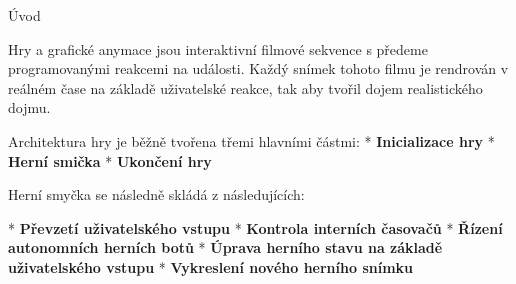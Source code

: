 \chap Úvod

Hry a grafické anymace jsou interaktivní filmové sekvence s předeme programovanými reakcemi na události. Každý snímek tohoto filmu je rendrován v reálném čase na základě uživatelské reakce, tak aby tvořil dojem realistického dojmu. 

Architektura hry je běžně tvořena třemi hlavními částmi:
\begitems 
* {\bf Inicializace hry}
* {\bf Herní smička}
* {\bf Ukončení hry}
\enditems

Herní smyčka se následně skládá z následujících:

\begitems
* {\bf Převzetí uživatelského vstupu}
* {\bf Kontrola interních časovačů}
* {\bf Řízení autonomních herních botů}
* {\bf Úprava herního stavu na základě uživatelského vstupu}
* {\bf Vykreslení nového herního snímku}
\enditems


